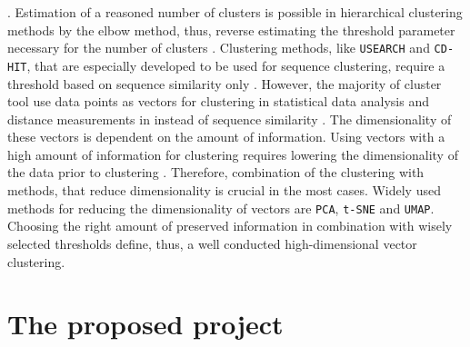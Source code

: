 \autocite{madhulatha_overview_2012}. Estimation of a reasoned number of clusters is possible in hierarchical clustering methods by the elbow method, thus, reverse estimating the threshold parameter necessary for the number of clusters \autocite{satopaa_finding_2011, madhulatha_overview_2012}. Clustering methods, like \texttt{USEARCH} and \texttt{CD-HIT}, that are especially developed to be used for sequence clustering, require a threshold based on sequence similarity only \autocite{li_cd-hit_2006, edgar_usearch_2010}. However, the majority of cluster tool use data points as vectors for clustering in statistical data analysis and distance measurements in instead of sequence similarity \autocite{madhulatha_overview_2012}. The dimensionality of these vectors is dependent on the amount of information. Using vectors with a high amount of information for clustering requires lowering the dimensionality of the data prior to clustering \autocite{assent_clustering_2012}. Therefore, combination of the clustering with methods, that reduce dimensionality is crucial in the most cases. Widely used methods for reducing the dimensionality of vectors are \texttt{PCA}, \texttt{t-SNE} and \texttt{UMAP}. Choosing the right amount of preserved information in combination with wisely selected thresholds define, thus, a well conducted high-dimensional vector clustering. 

\section{The proposed project}

